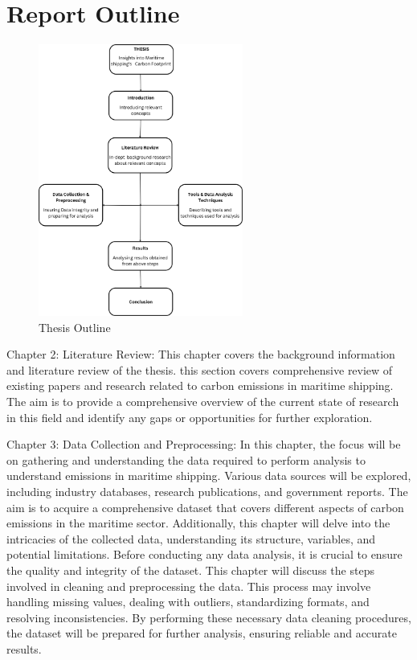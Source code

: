 \section{Report Outline}

\begin{figure}[ht]
    \centering
    \includegraphics[width=0.6\textwidth]{images/thesis_outline.png}
    \caption{Thesis Outline}
    \label{fig:outline}
\end{figure}

\noindent Chapter 2: Literature Review: This chapter covers the background information and literature review of the thesis.
this section covers comprehensive review of existing papers and research related to carbon emissions in maritime shipping.
The aim is to provide a comprehensive overview of the current state of research in this field and identify any gaps or opportunities for further exploration.


\noindent Chapter 3: Data Collection and Preprocessing:
In this chapter, the focus will be on gathering and understanding the data required to perform analysis to understand emissions in maritime shipping.
Various data sources will be explored, including industry databases, research publications, and government reports.
The aim is to acquire a comprehensive dataset that covers different aspects of carbon emissions in the maritime sector.
Additionally, this chapter will delve into the intricacies of the collected data, understanding its structure, variables, and potential limitations.
Before conducting any data analysis, it is crucial to ensure the quality and integrity of the dataset.
This chapter will discuss the steps involved in cleaning and preprocessing the data.
This process may involve handling missing values, dealing with outliers, standardizing formats, and resolving inconsistencies.
By performing these necessary data cleaning procedures, the dataset will be prepared for further analysis, ensuring reliable and accurate results.

